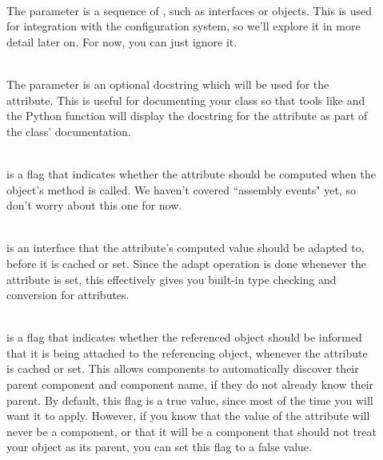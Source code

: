 \begin{verbatim%
}
\begin{verbatim%
}
\begin{verbatim%
}
\begin{verbatim%
}
\begin{verbatim%
}
\begin{verbatim%
}
\begin{verbatim%
}
\begin{verbatim%
}
\begin{verbatim%
}
\begin{description}
\item[] \hfill \\
The  parameter is a sequence of
, such as interfaces or 
objects.  This is used for integration with the configuration system, so we'll
explore it in more detail later on.  For now, you can just ignore it.

\item[] \hfill \\
The  parameter is an optional docstring which will be used for the
attribute.  This is useful for documenting your class so that tools like
 and the Python  function will display the
docstring for the attribute as part of the class' documentation.

\item[] \hfill \\
 is a flag that indicates whether the attribute should
be computed when the object's  method is called.  We
haven't covered ``assembly events" yet, so don't worry about this one for now.



\item[] \hfill \\
 is an interface that the attribute's computed value should be
adapted to, before it is cached or set.  Since the adapt
operation is done whenever the attribute is set, this effectively gives you
built-in type checking and conversion for attributes.

\item[] \hfill \\
 is a flag that indicates whether the referenced object
should be informed that it is being attached to the referencing object,
whenever the attribute is cached or set.  This allows components to
automatically discover their parent component and component name, if they do
not already know their parent.  By default, this flag is a true value, since
most of the time you will want it to apply.  However, if you know that the
value of the attribute will never be a component, or that it will be a
component that should not treat your object as its parent, you can set this
flag to a false value.


\end{description}
\end{verbatim%
}
\end{verbatim%
}
\end{verbatim%
}
\end{verbatim%
}
\end{verbatim%
}
\end{verbatim%
}
\end{verbatim%
}
\end{verbatim%
}
\end{verbatim%
}
